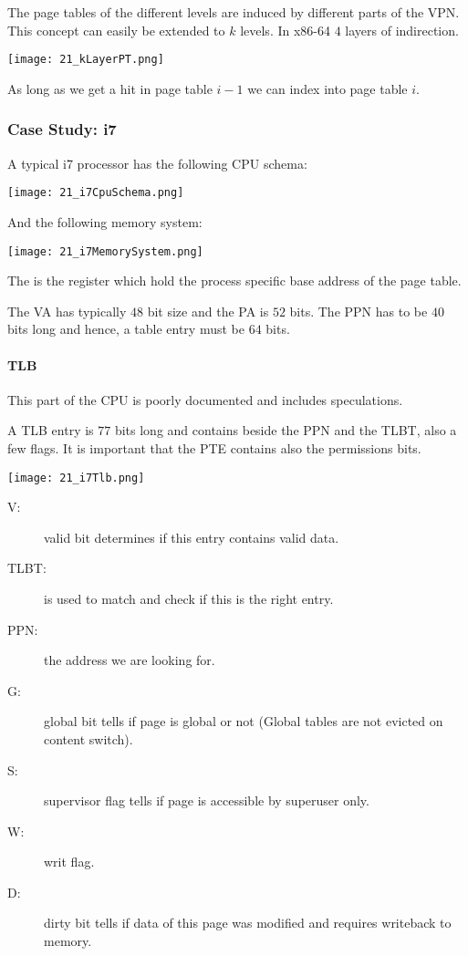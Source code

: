 The page tables of the different levels are induced by different parts of the VPN. This concept can easily be extended to $k$ levels. In x86-64 $4$ layers of indirection.

\texttt{[image: 21\_kLayerPT.png]}

As long as we get a hit in page table $i-1$ we can index into page table $i$.

\subsubsection{Case Study: i7}
A typical i7 processor has the following CPU schema:

\texttt{[image: 21\_i7CpuSchema.png]}

And the following memory system:

\texttt{[image: 21\_i7MemorySystem.png]}

The  is the register which hold the process specific base address of the page table.

The VA has typically $48$ bit size and the PA is $52$ bits. The PPN has to be $40$ bits long and hence, a table entry must be $64$ bits.

\paragraph{TLB}
This part of the CPU is poorly documented and includes speculations.

A TLB entry is $77$ bits long and contains beside the PPN and the TLBT, also a few flags. It is important that the PTE contains also the permissions bits.

\texttt{[image: 21\_i7Tlb.png]}

\begin{description}
    \item[V:] valid bit determines if this entry contains valid data.
    \item[TLBT:] is used to match and check if this is the right entry.
    \item[PPN:] the address we are looking for.
    \item[G:] global bit tells if page is global or not (Global tables are not evicted on content switch).
    \item[S:] supervisor flag tells if page is accessible by superuser only.
    \item[W:] writ flag.
    \item[D:] dirty bit tells if data of this page was modified and requires writeback to memory.
\end{description}

